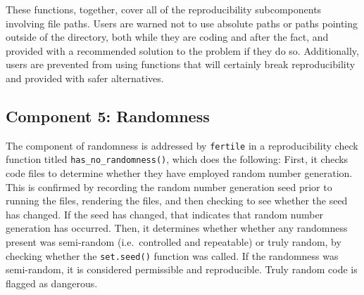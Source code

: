 \documentclass[12pt,twoside]{reedthesis}
\begin{document}
These functions, together, cover all of the reproducibility
subcomponents involving file paths. Users are warned not to use absolute
paths or paths pointing outside of the directory, both while they are
coding and after the fact, and provided with a recommended solution to
the problem if they do so. Additionally, users are prevented from using
functions that will certainly break reproducibility and provided with
safer alternatives.

\subsection{Component 5: Randomness}\label{component-5-randomness}

The component of randomness is addressed by \texttt{fertile} in a
reproducibility check function titled \texttt{has\_no\_randomness()},
which does the following: First, it checks code files to determine
whether they have employed random number generation. This is confirmed
by recording the random number generation seed prior to running the
files, rendering the files, and then checking to see whether the seed
has changed. If the seed has changed, that indicates that random number
generation has occurred. Then, it determines whether whether any
randomness present was semi-random (i.e.~controlled and repeatable) or
truly random, by checking whether the \texttt{set.seed()} function was
called. If the randomness was semi-random, it is considered permissible
and reproducible. Truly random code is flagged as dangerous.
\end{document}
